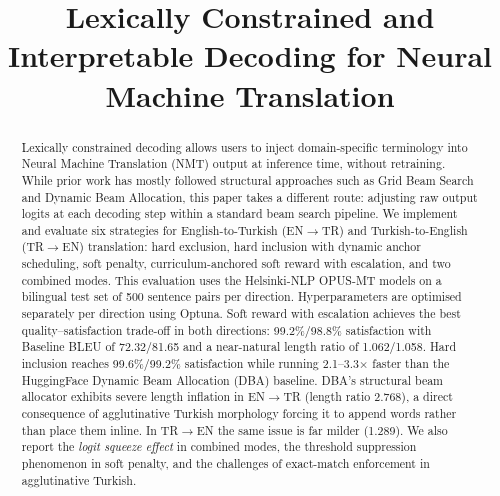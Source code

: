 \documentclass{tlp}
\begin{document}

\title[Lexically Constrained and Interpretable Decoding for NMT]{Lexically Constrained and Interpretable Decoding for Neural Machine Translation}

\begin{authgrp}
\author{ }
\end{authgrp}


\maketitle

\begin{abstract}
Lexically constrained decoding allows users to inject domain-specific terminology
into Neural Machine Translation (NMT) output at inference time, without retraining.
While prior work has mostly followed structural approaches such as Grid Beam Search
and Dynamic Beam Allocation, this paper takes a different route: adjusting raw output
logits at each decoding step within a standard beam search pipeline. We implement and
evaluate six strategies for English-to-Turkish (EN$\rightarrow$TR) and
Turkish-to-English (TR$\rightarrow$EN) translation: hard exclusion, hard inclusion
with dynamic anchor scheduling, soft penalty, curriculum-anchored soft reward with
escalation, and two combined modes. This evaluation uses the Helsinki-NLP OPUS-MT
models on a bilingual test set of 500 sentence pairs per direction. Hyperparameters
are optimised separately per direction using Optuna. Soft reward with escalation
achieves the best quality--satisfaction trade-off in both directions: 99.2\%/98.8\%
satisfaction with Baseline BLEU of 72.32/81.65 and a near-natural length ratio of
1.062/1.058. Hard inclusion reaches 99.6\%/99.2\% satisfaction while running
2.1--3.3$\times$ faster than the HuggingFace Dynamic Beam Allocation (DBA) baseline.
DBA's structural beam allocator exhibits severe length inflation in EN$\rightarrow$TR
(length ratio 2.768), a direct consequence of agglutinative Turkish morphology
forcing it to append words rather than place them inline. In TR$\rightarrow$EN the
same issue is far milder (1.289). We also report the \emph{logit squeeze effect} in
combined modes, the threshold suppression phenomenon in soft penalty, and the
challenges of exact-match enforcement in agglutinative Turkish.
\end{abstract}
\end{document}
